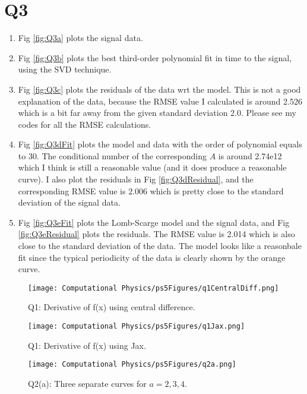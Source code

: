 \documentclass[11pt]{article}
\begin{document}
\section{Q3}
\begin{enumerate}[label=(\alph*)]
    \item Fig \ref{fig:Q3a} plots the signal data.
    \item Fig \ref{fig:Q3b} plots the best third-order polynomial fit in time to the signal, using the SVD technique.
    \item Fig \ref{fig:Q3c} plots the residuals of the data wrt the model. This is not a good explanation of the data, because the RMSE value I calculated is around 2.526 which is a bit far away from the given standard deviation 2.0. Please see my codes for all the RMSE calculations.
    \item Fig \ref{fig:Q3dFit} plots the model and data with the order of polynomial equals to 30. The conditional number of the corresponding $A$ is around 2.74e12 which I think is still a reasonable value (and it does produce a reasonable curve). I also plot the residuals in Fig \ref{fig:Q3dResidual}, and the corresponding RMSE value is $2.006$ which is pretty close to the standard deviation of the signal data.
    \item Fig \ref{fig:Q3eFit} plots the Lomb-Scarge model and the signal data, and Fig \ref{fig:Q3eResidual} plots the residuals. The RMSE value is 2.014 which is also close to the standard deviation of the data. The model looks like a reasonbale fit since the typical periodicity of the data is clearly shown by the orange curve.
\end{enumerate}

\begin{figure}[b!]
\centering
\texttt{[image: Computational Physics/ps5Figures/q1CentralDiff.png]}
\caption{Q1: Derivative of f(x) using central difference.}
  \label{fig:Q1CD}
\end{figure}

\begin{figure}[b!]
\centering
\texttt{[image: Computational Physics/ps5Figures/q1Jax.png]}
\caption{Q1: Derivative of f(x) using Jax.}
  \label{fig:Q1Jax}
\end{figure}

\begin{figure}[b!]
\centering
\texttt{[image: Computational Physics/ps5Figures/q2a.png]}
\caption{Q2(a): Three separate curves for $a=2,3,4$.}
  \label{fig:Q2a}
\end{figure}
\end{document}
